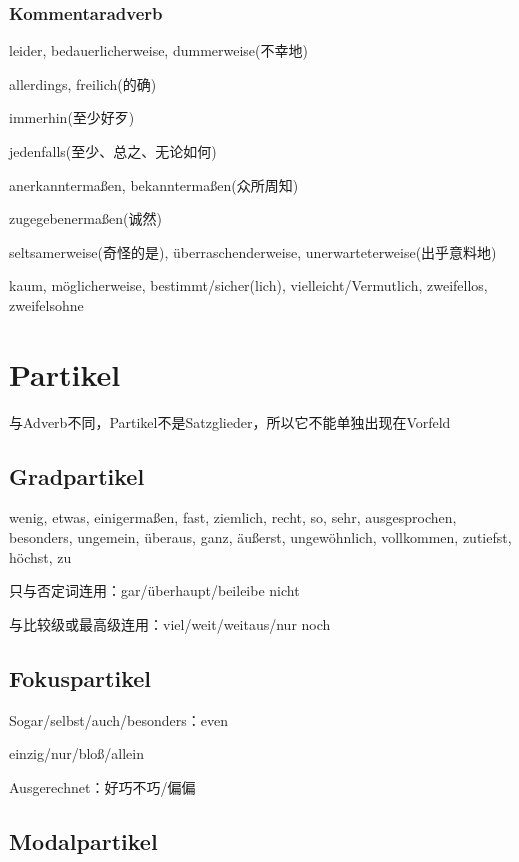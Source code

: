\documentclass[UTF8]{report}
\begin{document}
\subsection{Kommentaradverb}
leider, bedauerlicherweise, dummerweise(不幸地)

allerdings, freilich(的确)

immerhin(至少好歹)

jedenfalls(至少、总之、无论如何)

anerkanntermaßen, bekanntermaßen(众所周知)

zugegebenermaßen(诚然)

seltsamerweise(奇怪的是), überraschenderweise, unerwarteterweise(出乎意料地)

kaum, möglicherweise, bestimmt/sicher(lich), vielleicht/Vermutlich, zweifellos, zweifelsohne

\chapter{Partikel}
与Adverb不同，Partikel不是Satzglieder，所以它不能单独出现在Vorfeld



\section{Gradpartikel}
wenig, etwas, einigermaßen, fast, ziemlich, recht, so, sehr, ausgesprochen, besonders, ungemein, überaus, ganz, äußerst, ungewöhnlich, vollkommen, zutiefst, höchst, zu

只与否定词连用：gar/überhaupt/beileibe nicht

与比较级或最高级连用：viel/weit/weitaus/nur noch

\section{Fokuspartikel}
Sogar/selbst/auch/besonders：even

einzig/nur/bloß/allein

Ausgerechnet：好巧不巧/偏偏

\section{Modalpartikel}
\end{document}
